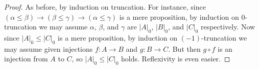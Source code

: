 \documentclass[10pt,a4paper]{article}
\newcommand{\tproj}[3][]{\mathopen{}\left|#3\right|_{#2}^{#1}\mathclose{}}
\def\cd{\tproj0}
\theoremstyle{definition}
\theoremstyle{remark}
\numberwithin{equation}{section}
\begin{document}
\begin{proof}
  As before, by induction on truncation.
  For instance, since $(\alpha \le \beta) \to (\beta\le\gamma) \to (\alpha\le\gamma)$ is a mere proposition, by induction on 0-truncation we may assume $\alpha$, $\beta$, and $\gamma$ are $\cd{A}$, $\cd{B}$, and $\cd{C}$ respectively.
  Now since $\cd{A} \le \cd{C}$ is a mere proposition, by induction on $(-1)$-truncation we may assume given injections $f:A\to B$ and $g:B\to C$.
  But then $g\circ f$ is an injection from $A$ to $C$, so $\cd{A} \le \cd{C}$ holds.
  Reflexivity is even easier.
\end{proof}
\end{document}
